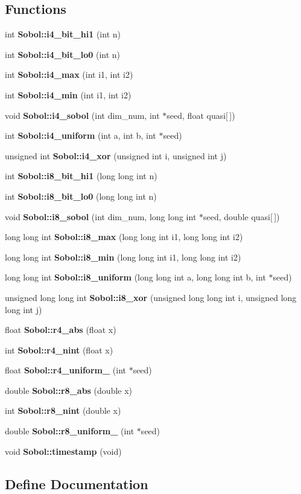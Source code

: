 \subsection*{Functions}
\begin{CompactItemize}
\item 
int {\bf Sobol::i4\_\-bit\_\-hi1} (int n)
\item 
int {\bf Sobol::i4\_\-bit\_\-lo0} (int n)
\item 
int {\bf Sobol::i4\_\-max} (int i1, int i2)
\item 
int {\bf Sobol::i4\_\-min} (int i1, int i2)
\item 
void {\bf Sobol::i4\_\-sobol} (int dim\_\-num, int $\ast$seed, float quasi[$\,$])
\item 
int {\bf Sobol::i4\_\-uniform} (int a, int b, int $\ast$seed)
\item 
unsigned int {\bf Sobol::i4\_\-xor} (unsigned int i, unsigned int j)
\item 
int {\bf Sobol::i8\_\-bit\_\-hi1} (long long int n)
\item 
int {\bf Sobol::i8\_\-bit\_\-lo0} (long long int n)
\item 
void {\bf Sobol::i8\_\-sobol} (int dim\_\-num, long long int $\ast$seed, double quasi[$\,$])
\item 
long long int {\bf Sobol::i8\_\-max} (long long int i1, long long int i2)
\item 
long long int {\bf Sobol::i8\_\-min} (long long int i1, long long int i2)
\item 
long long int {\bf Sobol::i8\_\-uniform} (long long int a, long long int b, int $\ast$seed)
\item 
unsigned long long int {\bf Sobol::i8\_\-xor} (unsigned long long int i, unsigned long long int j)
\item 
float {\bf Sobol::r4\_\-abs} (float x)
\item 
int {\bf Sobol::r4\_\-nint} (float x)
\item 
float {\bf Sobol::r4\_\-uniform\_} (int $\ast$seed)
\item 
double {\bf Sobol::r8\_\-abs} (double x)
\item 
int {\bf Sobol::r8\_\-nint} (double x)
\item 
double {\bf Sobol::r8\_\-uniform\_} (int $\ast$seed)
\item 
void {\bf Sobol::timestamp} (void)
\end{CompactItemize}


\subsection{Define Documentation}
